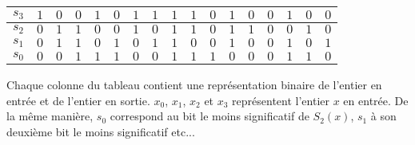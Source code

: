 \documentclass{article}
\begin{document}
\begin{center}
\begin{tabular}{|l|l|l|l|l|l|l|l|l|l|l|l|l|l|l|l|l|}
\hline
\multicolumn{1}{|l|}{$s_{3}$}&	\multicolumn{1}{|l|}{ $1$}&	\multicolumn{1}{|l|}{ $0$}&	\multicolumn{1}{|l|}{ $0$}&	\multicolumn{1}{|l|}{ $1$}&	\multicolumn{1}{|l|}{ $0$}&	\multicolumn{1}{|l|}{ $1$}&	\multicolumn{1}{|l|}{ $1$}&	\multicolumn{1}{|l|}{ $1$}&	\multicolumn{1}{|l|}{ $1$}&	\multicolumn{1}{|l|}{ $0$}&	\multicolumn{1}{|l|}{ $1$}&	\multicolumn{1}{|l|}{ $0$}&	\multicolumn{1}{|l|}{ $0$}&	\multicolumn{1}{|l|}{ $1$}&	\multicolumn{1}{|l|}{ $0$}&	\multicolumn{1}{|l|}{ $0$}	\\
\hline
\multicolumn{1}{|l|}{ $s_{2}$}&	\multicolumn{1}{|l|}{ $0$}&	\multicolumn{1}{|l|}{ $1$}&	\multicolumn{1}{|l|}{ $1$}&	\multicolumn{1}{|l|}{ $0$}&	\multicolumn{1}{|l|}{ $0$}&	\multicolumn{1}{|l|}{ $1$}&	\multicolumn{1}{|l|}{ $0$}&	\multicolumn{1}{|l|}{ $1$}&	\multicolumn{1}{|l|}{ $1$}&	\multicolumn{1}{|l|}{ $0$}&	\multicolumn{1}{|l|}{ $1$}&	\multicolumn{1}{|l|}{ $1$}&	\multicolumn{1}{|l|}{ $0$}&	\multicolumn{1}{|l|}{ $0$}&	\multicolumn{1}{|l|}{ $1$}&	\multicolumn{1}{|l|}{ $0$}	\\
\hline
\multicolumn{1}{|l|}{ $s_{1}$}&	\multicolumn{1}{|l|}{ $0$}&	\multicolumn{1}{|l|}{ $1$}&	\multicolumn{1}{|l|}{ $1$}&	\multicolumn{1}{|l|}{ $0$}&	\multicolumn{1}{|l|}{ $1$}&	\multicolumn{1}{|l|}{ $0$}&	\multicolumn{1}{|l|}{ $1$}&	\multicolumn{1}{|l|}{ $1$}&	\multicolumn{1}{|l|}{ $0$}&	\multicolumn{1}{|l|}{ $0$}&	\multicolumn{1}{|l|}{ $1$}&	\multicolumn{1}{|l|}{ $0$}&	\multicolumn{1}{|l|}{ $0$}&	\multicolumn{1}{|l|}{ $1$}&	\multicolumn{1}{|l|}{ $0$}&	\multicolumn{1}{|l|}{ $1$}	\\
\hline
\multicolumn{1}{|l|}{ $s_{0}$}&	\multicolumn{1}{|l|}{ $0$}&	\multicolumn{1}{|l|}{ $0$}&	\multicolumn{1}{|l|}{ $1$}&	\multicolumn{1}{|l|}{ $1$}&	\multicolumn{1}{|l|}{ $1$}&	\multicolumn{1}{|l|}{ $0$}&	\multicolumn{1}{|l|}{ $0$}&	\multicolumn{1}{|l|}{ $1$}&	\multicolumn{1}{|l|}{ $1$}&	\multicolumn{1}{|l|}{ $1$}&	\multicolumn{1}{|l|}{ $0$}&	\multicolumn{1}{|l|}{ $0$}&	\multicolumn{1}{|l|}{ $0$}&	\multicolumn{1}{|l|}{ $1$}&	\multicolumn{1}{|l|}{ $1$}&	\multicolumn{1}{|l|}{ $0$}	\\
\hline
\end{tabular}

\end{center}
\medbreak

Chaque colonne du tableau contient une représentation binaire de l'entier en entrée et de l'entier en sortie. $x_{0}$, $x_{1}$, $x_{2}$ et $x_{3}$ représentent l'entier $x$ en entrée. De la même manière, $s_{0}$ correspond au bit le moins significatif de $S_{2}(x)$, $s_{1}$ à son deuxième bit le moins significatif etc...
\end{document}
